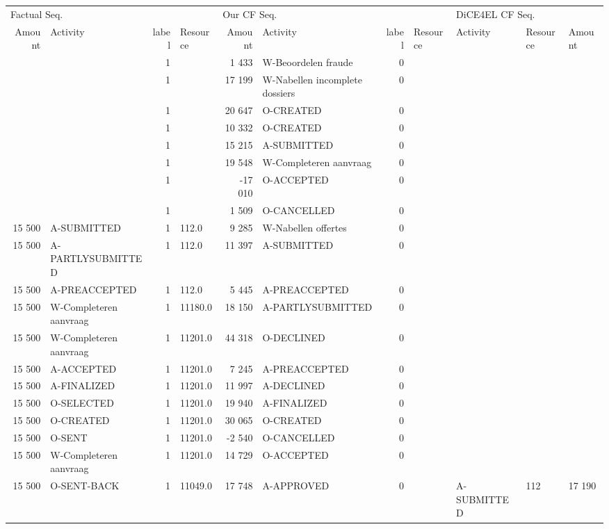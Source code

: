 \begin{tabular}{rlrlrlrllll}
\toprule
\multicolumn{4}{l}{Factual Seq.} & \multicolumn{4}{l}{Our CF Seq.} & \multicolumn{3}{l}{DiCE4EL CF Seq.} \\
Amount & Activity & label & Resource & Amount & Activity & label & Resource & Activity & Resource & Amount \\
\midrule
 &  & 1 &  & 1 433 & W-Beoordelen fraude & 0 &  &  &  &  \\
 &  & 1 &  & 17 199 & W-Nabellen incomplete dossiers & 0 &  &  &  &  \\
 &  & 1 &  & 20 647 & O-CREATED & 0 &  &  &  &  \\
 &  & 1 &  & 10 332 & O-CREATED & 0 &  &  &  &  \\
 &  & 1 &  & 15 215 & A-SUBMITTED & 0 &  &  &  &  \\
 &  & 1 &  & 19 548 & W-Completeren aanvraag & 0 &  &  &  &  \\
 &  & 1 &  & -17 010 & O-ACCEPTED & 0 &  &  &  &  \\
 &  & 1 &  & 1 509 & O-CANCELLED & 0 &  &  &  &  \\
15 500 & A-SUBMITTED & 1 & 112.0 & 9 285 & W-Nabellen offertes & 0 &  &  &  &  \\
15 500 & A-PARTLYSUBMITTED & 1 & 112.0 & 11 397 & A-SUBMITTED & 0 &  &  &  &  \\
15 500 & A-PREACCEPTED & 1 & 112.0 & 5 445 & A-PREACCEPTED & 0 &  &  &  &  \\
15 500 & W-Completeren aanvraag & 1 & 11180.0 & 18 150 & A-PARTLYSUBMITTED & 0 &  &  &  &  \\
15 500 & W-Completeren aanvraag & 1 & 11201.0 & 44 318 & O-DECLINED & 0 &  &  &  &  \\
15 500 & A-ACCEPTED & 1 & 11201.0 & 7 245 & A-PREACCEPTED & 0 &  &  &  &  \\
15 500 & A-FINALIZED & 1 & 11201.0 & 11 997 & A-DECLINED & 0 &  &  &  &  \\
15 500 & O-SELECTED & 1 & 11201.0 & 19 940 & A-FINALIZED & 0 &  &  &  &  \\
15 500 & O-CREATED & 1 & 11201.0 & 30 065 & O-CREATED & 0 &  &  &  &  \\
15 500 & O-SENT & 1 & 11201.0 & -2 540 & O-CANCELLED & 0 &  &  &  &  \\
15 500 & W-Completeren aanvraag & 1 & 11201.0 & 14 729 & O-ACCEPTED & 0 &  &  &  &  \\
15 500 & O-SENT-BACK & 1 & 11049.0 & 17 748 & A-APPROVED & 0 &  & A-SUBMITTED & 112 & 17 190 \\

\end{tabular}
